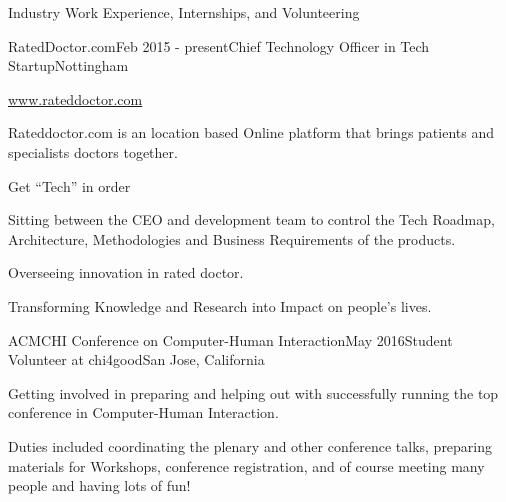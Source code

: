 \documentclass{resume} %
\begin{document}


\begin{rSection}{Industry Work Experience, Internships, and Volunteering}
    \begin{rSubsection}{RatedDoctor.com}{Feb 2015 - present}{Chief Technology Officer in Tech Startup}{Nottingham}
        \item \url{www.rateddoctor.com}
        \item Rateddoctor.com is an location based Online platform that brings patients and specialists doctors together.
		\item Get ``Tech'' in order
		\item Sitting between the CEO and  development team to control the Tech Roadmap, Architecture, Methodologies and Business Requirements of the products.
		\item Overseeing innovation in rated doctor.
		\item Transforming Knowledge and Research into Impact on people's lives.
    \end{rSubsection}

	\begin{rSubsection}{ACMCHI Conference on  Computer-Human Interaction}{May 2016}{Student Volunteer at chi4good}{San Jose, California}
        \item Getting involved in preparing and helping out with successfully running the top conference in Computer-Human Interaction. 
        \item Duties included coordinating the plenary and other conference talks, preparing materials for Workshops, conference registration, and of course meeting many people and having lots of fun!
    \end{rSubsection}


\end{rSection}
\end{document}
